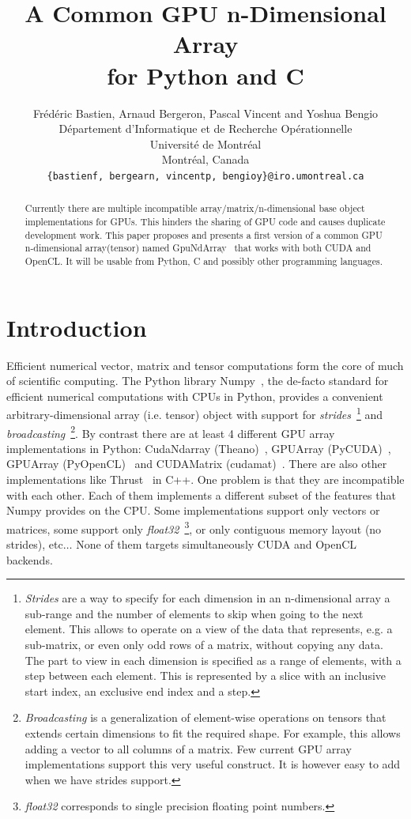 \documentclass{article} %
\title{A Common GPU n-Dimensional Array \\
 for Python and C}
\author{
Frédéric Bastien, Arnaud Bergeron, Pascal Vincent and Yoshua Bengio \\
D\'epartement d'Informatique et de Recherche Op\'erationnelle\\
Universit\'e de Montr\'eal\\
Montr\'eal, Canada \\
\texttt{\{bastienf, bergearn, vincentp, bengioy\}@iro.umontreal.ca} \\
}
\begin{document}
\maketitle

\begin{abstract}
Currently there are multiple incompatible array/matrix/n-dimensional base object implementations for GPUs. 
This hinders the sharing of GPU code and causes duplicate development work.
This paper proposes and presents a first version of a common GPU n-dimensional array(tensor) named GpuNdArray~\citep{GpuNdArray} that works with both CUDA and OpenCL.
It will be usable from Python, C and possibly other programming languages.
\end{abstract}

\section{Introduction}
Efficient numerical vector, matrix and tensor computations form the core of much of scientific computing.
The Python library Numpy~\citep{numpy-2007}, the de-facto standard for efficient numerical computations with CPUs in Python, provides a convenient 
arbitrary-dimensional array (i.e. tensor) object with support for \emph{strides}~\footnote{
\emph{Strides} are a way to specify for each dimension in an n-dimensional array a sub-range and the number of elements to skip when going
to the next element. 
This allows to operate on a view of the data that represents, e.g. a sub-matrix, or even only odd rows of a matrix, without copying any data.
The part to view in each dimension is specified as a range of elements, with a step between each element.
This is represented by a slice with an inclusive start index, an exclusive end index and a step.
}
and \emph{broadcasting}~\footnote{
\emph{Broadcasting} is a generalization of element-wise operations on tensors that extends certain dimensions to fit the required shape.
For example, this allows adding a vector to all columns of a matrix.
Few current GPU array implementations support this very useful construct.
It is however easy to add when we have strides support.
}.
By contrast there are at least 4 different GPU array implementations in
Python: CudaNdarray (Theano)~\citep{bergstra+al:2010-scipy},
GPUArray (PyCUDA)~\citep{kloeckner_pycuda_2009},
GPUArray (PyOpenCL)~\citep{kloeckner_pycuda_2009} and
CUDAMatrix (cudamat)~\citep{cudamat-TR2009}.
There are also other implementations like Thrust~\citep{Thrust} in C++.
One problem is that they are incompatible with each other.
Each of them implements a different subset of the features that Numpy provides on the CPU.
Some implementations support only vectors or matrices, some support only \emph{float32}~\footnote{
\emph{float32} corresponds to single precision floating point numbers.
}, or only contiguous memory layout (no strides), etc$\ldots$
None of them targets simultaneously CUDA and OpenCL backends.
\end{document}
